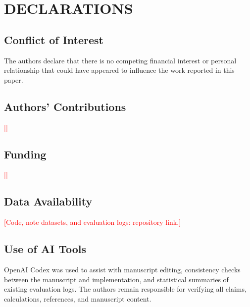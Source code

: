 \documentclass{IJCAS}
\newcommand{\tbd}[1]{\textcolor{red}{[#1]}}
\begin{document}
\section*{DECLARATIONS}
\subsection*{Conflict of Interest}
The authors declare that there is no competing financial interest or personal relationship that could have appeared to influence the work reported in this paper.
\subsection*{Authors' Contributions}
\tbd{}
\subsection*{Funding}
\tbd{}
\subsection*{Data Availability}
\tbd{Code, note datasets, and evaluation logs: repository link.}
\subsection*{Use of AI Tools}
OpenAI Codex was used to assist with manuscript editing, consistency checks between the manuscript and implementation, and statistical summaries of existing evaluation logs. The authors remain responsible for verifying all claims, calculations, references, and manuscript content.
\end{document}
